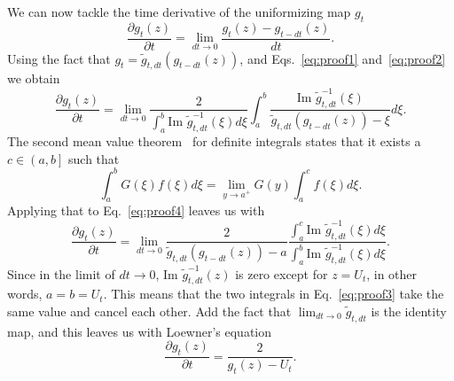 We can now tackle the time derivative of the uniformizing map $g_t$
\begin{equation}
    \frac{\partial g_{t}\left(z\right)}{\partial t}=
    \lim_{dt\rightarrow0}\frac{g_{t}\left(z\right)-g_{t-dt}\left(z\right)}{dt}.
\end{equation}
Using the fact that $g_{t}=\tilde{g}_{t,dt}\left(g_{t-dt}\left(z\right)\right)$,
and Eqs.~\ref{eq:proof1} and~\ref{eq:proof2} we obtain
\begin{equation}
    \frac{\partial g_{t}\left(z\right)}{\partial t}=
    \lim_{dt\rightarrow0}\frac{2}
    {\int_{a}^{b}\mbox{Im }\tilde{g}_{t,dt}^{-1}\left(\xi\right)d\xi}
    \int_{a}^{b}
    \frac{\mbox{Im }\tilde{g}_{t,dt}^{-1}\left(\xi\right)}
    {\tilde{g}_{t,dt}\left(g_{t-dt}\left(z\right)\right)-\xi}d\xi.
    \label{eq:proof4}
\end{equation}
The second mean value theorem~\cite{Comenetz2002} for definite integrals states that
it exists a $c\in\left(a,b\right]$ such that
\begin{equation}
    \int_{a}^{b}G\left(\xi\right)f\left(\xi\right)d\xi=
    \lim_{y\rightarrow a^+}G\left(y\right)\int_{a}^{c}f\left(\xi\right)d\xi.
\end{equation}
Applying that to Eq.~\ref{eq:proof4} leaves us with
\begin{equation}
    \label{eq:proof3}
     \frac{\partial g_{t}\left(z\right)}{\partial t}=
     \lim_{dt\rightarrow0}
     \frac{2}{\tilde{g}_{t,dt}\left(g_{t-dt}\left(z\right)\right)-a}
     \frac{\int_{a}^{c}\mbox{Im }\tilde{g}_{t,dt}^{-1}\left(\xi\right)d\xi}
          {\int_{a}^{b}\mbox{Im }\tilde{g}_{t,dt}^{-1}\left(\xi\right)d\xi}.
\end{equation}
Since in the limit of $dt\rightarrow0$, $\mbox{Im }\tilde{g}_{t,dt}^{-1}(z)$ is
zero except for $z=U_t$, in other words, $a=b=U_t$. This means that the two
integrals in Eq.~\ref{eq:proof3} take the same value and cancel each other. Add
the fact that $\lim_{dt\rightarrow 0}\tilde{g}_{t,dt}$ is the identity map, and
this leaves us with Loewner's equation
\begin{equation}
    \frac{\partial g_t(z)}{\partial t} = \frac{2}{g_t(z) - U_t}.
\end{equation}

